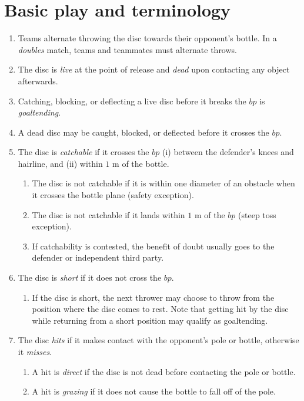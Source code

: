 \documentclass[11pt,letterpaper,twocolumn,english,DIV=calc]{scrartcl}
\begin{document}
\section{Basic play and terminology}
\begin{enumerate}
	\item Teams alternate throwing the disc towards their opponent's bottle.
		In a \emph{doubles} match, teams and teammates must alternate throws.
	\item The disc is \emph{live} at the point of release and \emph{dead} upon contacting any object afterwards.
	\item Catching, blocking, or deflecting a live disc before it breaks the $bp$ is \emph{goaltending}.
	\item A dead disc may be caught, blocked, or deflected before it crosses the $bp$.
	\item The disc is \emph{catchable} if it crosses the $bp$ (i) between the defender's knees and hairline, and (ii) within $1\mbox{ m}$ of the bottle.

	\begin{enumerate}
		\item The disc is not catchable if it is within one diameter of an obstacle when it crosses the bottle plane (safety exception).
		\item The disc is not catchable if it lands within $1\mbox{ m}$ of the $bp$ (steep toss exception).
		\item If catchability is contested, the benefit of doubt usually goes to the defender or independent third party.
	\end{enumerate}

	\item The disc is \emph{short} if it does not cross the $bp$.

	\begin{enumerate}
		\item If the disc is short, the next thrower may choose to throw from the position where the disc comes to rest. 
		Note that getting hit by the disc while returning from a short position may qualify as goaltending.
	\end{enumerate}

	\item The disc \emph{hits} if it makes contact with the opponent's pole or bottle, otherwise it \emph{misses}.

	\begin{enumerate}
		\item A hit is \emph{direct} if the disc is not dead before contacting the pole or bottle.
		\item A hit is \emph{grazing} if it does not cause the bottle to fall off of the pole.
	\end{enumerate}
\end{enumerate}
\end{document}
